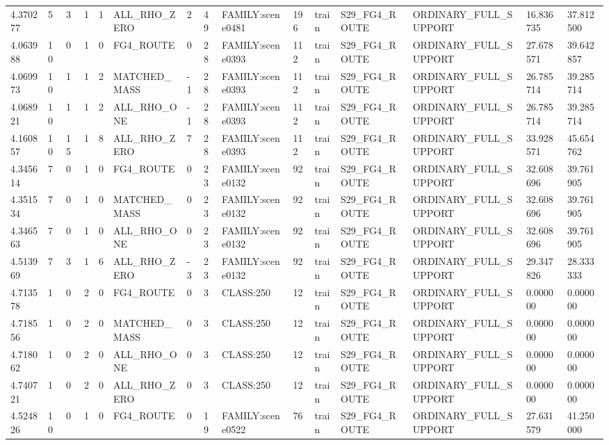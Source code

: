 \begin{tabular}{lllllllllllllll}
4.370277 & 5 & 3 & 1 & 1 & ALL\_RHO\_ZERO & 2 & 49 & FAMILY:scene0481 & 196 & train & S29\_FG4\_ROUTE & ORDINARY\_FULL\_SUPPORT & 16.836735 & 37.812500 \\
4.063988 & 10 & 0 & 1 & 0 & FG4\_ROUTE & 0 & 28 & FAMILY:scene0393 & 112 & train & S29\_FG4\_ROUTE & ORDINARY\_FULL\_SUPPORT & 27.678571 & 39.642857 \\
4.069973 & 10 & 1 & 1 & 2 & MATCHED\_MASS & -1 & 28 & FAMILY:scene0393 & 112 & train & S29\_FG4\_ROUTE & ORDINARY\_FULL\_SUPPORT & 26.785714 & 39.285714 \\
4.068921 & 10 & 1 & 1 & 2 & ALL\_RHO\_ONE & -1 & 28 & FAMILY:scene0393 & 112 & train & S29\_FG4\_ROUTE & ORDINARY\_FULL\_SUPPORT & 26.785714 & 39.285714 \\
4.160857 & 10 & 15 & 1 & 8 & ALL\_RHO\_ZERO & 7 & 28 & FAMILY:scene0393 & 112 & train & S29\_FG4\_ROUTE & ORDINARY\_FULL\_SUPPORT & 33.928571 & 45.654762 \\
4.345614 & 7 & 0 & 1 & 0 & FG4\_ROUTE & 0 & 23 & FAMILY:scene0132 & 92 & train & S29\_FG4\_ROUTE & ORDINARY\_FULL\_SUPPORT & 32.608696 & 39.761905 \\
4.351534 & 7 & 0 & 1 & 0 & MATCHED\_MASS & 0 & 23 & FAMILY:scene0132 & 92 & train & S29\_FG4\_ROUTE & ORDINARY\_FULL\_SUPPORT & 32.608696 & 39.761905 \\
4.346563 & 7 & 0 & 1 & 0 & ALL\_RHO\_ONE & 0 & 23 & FAMILY:scene0132 & 92 & train & S29\_FG4\_ROUTE & ORDINARY\_FULL\_SUPPORT & 32.608696 & 39.761905 \\
4.513969 & 7 & 3 & 1 & 6 & ALL\_RHO\_ZERO & -3 & 23 & FAMILY:scene0132 & 92 & train & S29\_FG4\_ROUTE & ORDINARY\_FULL\_SUPPORT & 29.347826 & 28.333333 \\
4.713578 & 1 & 0 & 2 & 0 & FG4\_ROUTE & 0 & 3 & CLASS:250 & 12 & train & S29\_FG4\_ROUTE & ORDINARY\_FULL\_SUPPORT & 0.000000 & 0.000000 \\
4.718556 & 1 & 0 & 2 & 0 & MATCHED\_MASS & 0 & 3 & CLASS:250 & 12 & train & S29\_FG4\_ROUTE & ORDINARY\_FULL\_SUPPORT & 0.000000 & 0.000000 \\
4.718062 & 1 & 0 & 2 & 0 & ALL\_RHO\_ONE & 0 & 3 & CLASS:250 & 12 & train & S29\_FG4\_ROUTE & ORDINARY\_FULL\_SUPPORT & 0.000000 & 0.000000 \\
4.740721 & 1 & 0 & 2 & 0 & ALL\_RHO\_ZERO & 0 & 3 & CLASS:250 & 12 & train & S29\_FG4\_ROUTE & ORDINARY\_FULL\_SUPPORT & 0.000000 & 0.000000 \\
4.524826 & 10 & 0 & 1 & 0 & FG4\_ROUTE & 0 & 19 & FAMILY:scene0522 & 76 & train & S29\_FG4\_ROUTE & ORDINARY\_FULL\_SUPPORT & 27.631579 & 41.250000 \\

\end{tabular}
